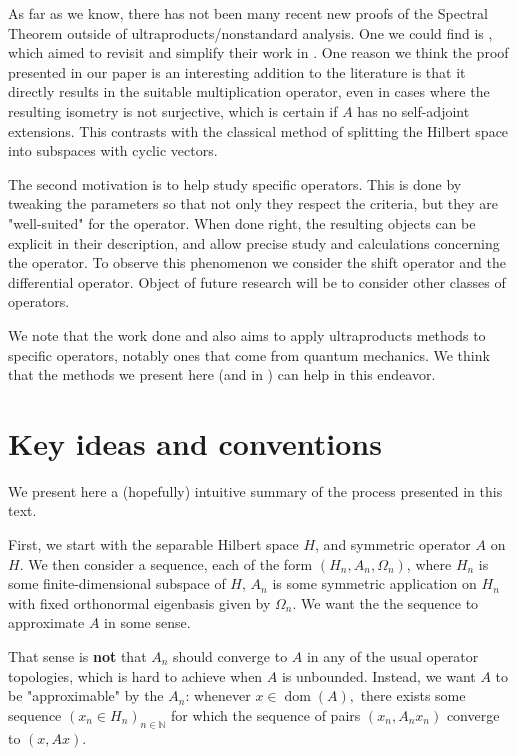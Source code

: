 \documentclass{amsart}
\theoremstyle{definition}
\theoremstyle{remark}
\def \Dom{\operatorname{dom}}
\begin{document}
As far as we know, there has not been many recent new proofs of the Spectral Theorem outside of ultraproducts/nonstandard analysis. One we could find is \cite{leinfelder2017secondlookageometric}, which aimed to revisit and simplify their work in \cite{leinfelder1979geometric}. One reason we think the proof presented in our paper is an interesting addition to the literature is that it directly results in the suitable multiplication operator, even in cases where the resulting isometry is not surjective, which is certain if $A$ has no self-adjoint extensions. This contrasts with the classical method of splitting the Hilbert space into subspaces with cyclic vectors.

The second motivation is to help study specific operators. This is done by tweaking the parameters so that not only they respect the criteria, but they are "well-suited" for the operator. When done right, the resulting objects can be explicit in their description, and allow precise study and calculations concerning the operator. To observe this phenomenon we consider the shift operator and the differential operator. Object of future research will be to consider other classes of operators. 

We note that the work done \cite{HIRVONEN_HYTTINEN_2024} and \cite{hyttinen2024approximationsfeynmanpathintegrals} also aims to apply ultraproducts methods to specific operators, notably ones that come from quantum mechanics. We think that the methods we present here (and in \cite{nonez2024spectralequivalencesnonstandardsamplings}) can help in this endeavor. 
\section{Key ideas and conventions}\label{section_idea}

We present here a (hopefully) intuitive summary of the process presented in this text.

First, we start with the separable Hilbert space $H$, and symmetric operator $A$ on $H$. We then consider a sequence, each of the form $(H_n, A_n, \Omega_n)$, where $H_n$ is some finite-dimensional subspace of $H$, $A_n$ is some symmetric application on $H_n$ with fixed orthonormal eigenbasis given by $\Omega_n.$ We want the the sequence to approximate $A$ in some sense. 

That sense is \textbf{not} that $A_n$ should converge to $A$  in any of the usual operator topologies, which is hard to achieve when $A$ is unbounded. Instead, we want $A$ to be "approximable" by the $A_n$: whenever $x\in\Dom(A),$ there exists some sequence $(x_n\in H_n)_{n\in\mathbb{N}}$ for which the sequence of pairs $(x_n, A_n x_n)$ converge to $(x,Ax)$.
\end{document}
